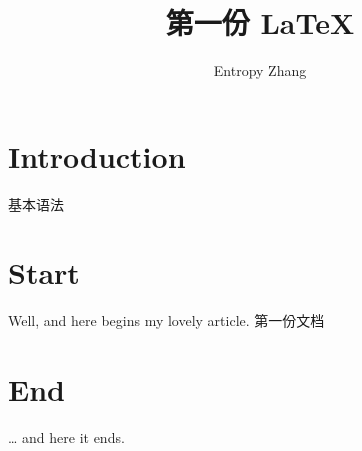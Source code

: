 \documentclass[a4paper,11pt]{article}
\author{Entropy Zhang}
\title{第一份 LaTeX}
\begin{document}
\begin{CJK}{UTF8}{gbsn} %

\maketitle
\tableofcontents


\section{Introduction}
基本语法

\section{Start}
Well, and here begins my lovely article.
第一份文档

\section{End}
\ldots{} and here it ends. 
\maketitle


\end{CJK}
\end{document}
